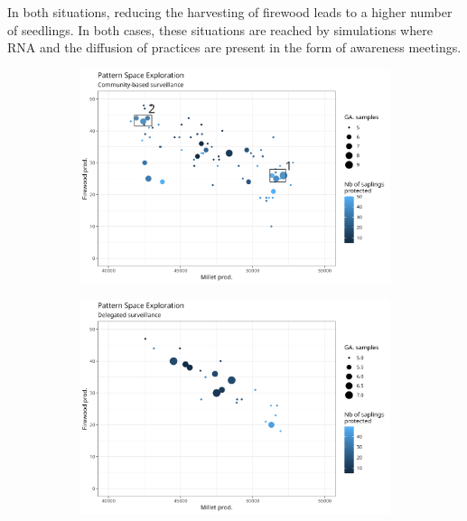 \documentclass{article}
\begin{document}
    In both situations, reducing the harvesting of firewood leads to a higher number of seedlings. In both cases, these situations are reached by simulations where RNA and the diffusion of practices are present in the form of awareness meetings.

    \begin{figure}[h]
        \centering
        \begin{subfigure}[b]{0.85\textwidth}
           \includegraphics[width=1\linewidth]{./img/om_pse_sPop.png}
           \caption{}
           \label{fig:pseSPOP} 
        \end{subfigure}
        
        \begin{subfigure}[b]{0.85\textwidth}
           \includegraphics[width=1\linewidth]{./img/om_pse_sReprez.png}
           \caption{}
           \label{fig:pseSDELEG}
        \end{subfigure}
        

\end{figure}
\end{document}
